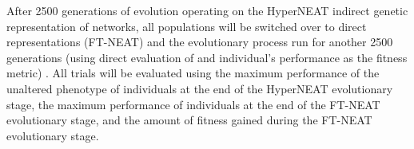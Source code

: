 After 2500 generations of evolution operating on the HyperNEAT indirect genetic representation of networks, all populations will be switched over to direct representations (FT-NEAT) and the evolutionary process run for another 2500 generations (using direct evaluation of and individual's performance as the fitness metric) \autocite{Clune2011OnRegularity}. All trials will be evaluated using the maximum performance of the unaltered phenotype of individuals at the end of the HyperNEAT evolutionary stage, the maximum performance of individuals at the end of the FT-NEAT evolutionary stage, and the amount of fitness gained during the FT-NEAT evolutionary stage.





